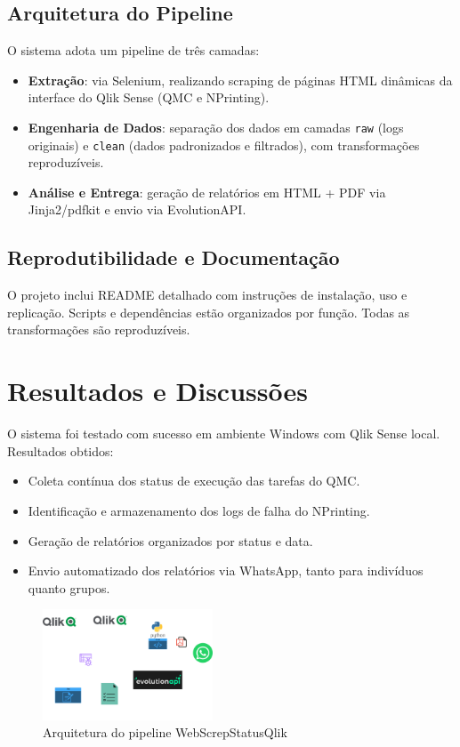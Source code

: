 \documentclass[conference]{IEEEtran}
\begin{document}
\subsection{Arquitetura do Pipeline}
O sistema adota um pipeline de três camadas:
\begin{itemize}
  \item \textbf{Extração}: via Selenium, realizando scraping de páginas HTML dinâmicas da interface do Qlik Sense (QMC e NPrinting).
  \item \textbf{Engenharia de Dados}: separação dos dados em camadas \texttt{raw} (logs originais) e \texttt{clean} (dados padronizados e filtrados), com transformações reproduzíveis.
  \item \textbf{Análise e Entrega}: geração de relatórios em HTML + PDF via Jinja2/pdfkit e envio via EvolutionAPI.
\end{itemize}

\subsection{Reprodutibilidade e Documentação}
O projeto inclui README detalhado com instruções de instalação, uso e replicação. Scripts e dependências estão organizados por função. Todas as transformações são reproduzíveis.

\section{Resultados e Discussões}
O sistema foi testado com sucesso em ambiente Windows com Qlik Sense local. Resultados obtidos:
\begin{itemize}
  \item Coleta contínua dos status de execução das tarefas do QMC.
  \item Identificação e armazenamento dos logs de falha do NPrinting.
  \item Geração de relatórios organizados por status e data.
  \item Envio automatizado dos relatórios via WhatsApp, tanto para indivíduos quanto grupos.
\end{itemize}

\begin{figure}[ht]
\centering
\includegraphics[width=0.45\textwidth]{img/WebScrep_QMC.drawio.png}
\caption{Arquitetura do pipeline WebScrepStatusQlik}
\end{figure}
\end{document}
